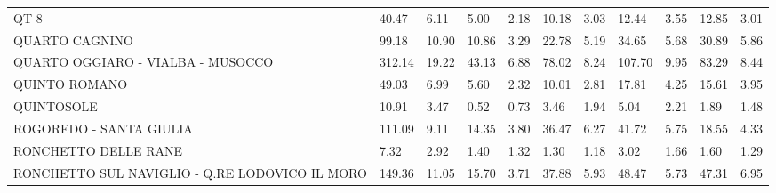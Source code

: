 \begin{table}[H]
{{\begin{tabular}{lp{1.3cm}p{1.3cm}p{1.3cm}p{1.3cm}p{1.3cm}p{1.3cm}p{1.3cm}p{1.3cm}p{1.3cm}p{1.3cm}}
QT 8                                               &                     40.47 &                  6.11 &                        5.00 &                    2.18 &                       10.18 &                    3.03 &                       12.44 &                    3.55 &                     12.85 &                  3.01 \\
QUARTO CAGNINO                                     &                     99.18 &                 10.90 &                       10.86 &                    3.29 &                       22.78 &                    5.19 &                       34.65 &                    5.68 &                     30.89 &                  5.86 \\
QUARTO OGGIARO - VIALBA - MUSOCCO                  &                    312.14 &                 19.22 &                       43.13 &                    6.88 &                       78.02 &                    8.24 &                      107.70 &                    9.95 &                     83.29 &                  8.44 \\
QUINTO ROMANO                                      &                     49.03 &                  6.99 &                        5.60 &                    2.32 &                       10.01 &                    2.81 &                       17.81 &                    4.25 &                     15.61 &                  3.95 \\
QUINTOSOLE                                         &                     10.91 &                  3.47 &                        0.52 &                    0.73 &                        3.46 &                    1.94 &                        5.04 &                    2.21 &                      1.89 &                  1.48 \\
ROGOREDO - SANTA GIULIA                            &                    111.09 &                  9.11 &                       14.35 &                    3.80 &                       36.47 &                    6.27 &                       41.72 &                    5.75 &                     18.55 &                  4.33 \\
RONCHETTO DELLE RANE                               &                      7.32 &                  2.92 &                        1.40 &                    1.32 &                        1.30 &                    1.18 &                        3.02 &                    1.66 &                      1.60 &                  1.29 \\
RONCHETTO SUL NAVIGLIO - Q.RE LODOVICO IL MORO     &                    149.36 &                 11.05 &                       15.70 &                    3.71 &                       37.88 &                    5.93 &                       48.47 &                    5.73 &                     47.31 &                  6.95 \\

\end{tabular}}}
\end{table}
